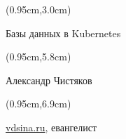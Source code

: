 \documentclass[xetex,18pt,aspectratio=43]{beamer}
\title[Базы данных в Kubernetes]{}
\author[Александр Чистяков, vdsina.ru]{}
\date{}
\newcommand\Bigfont{\fontsize{20}{20}\selectfont}
\newcommand\Authorfont{\fontsize{17}{17}\selectfont}
\newcommand\Orgfont{\fontsize{13}{13}\selectfont}
\begin{document}
{ %
    \begin{frame}[plain]
      \begin{textblock*}{\framewidth}(0.95cm,3.0cm) %
        \Bigfont
          \begin{center}
          Базы данных в Kubernetes
          \end{center}
      \end{textblock*}
      \begin{textblock*}{\framewidth}(0.95cm,5.8cm) %
        \Authorfont
          \begin{center}
          Александр Чистяков
          \end{center}
      \end{textblock*}
      \begin{textblock*}{\framewidth}(0.95cm,6.9cm) %
        \Orgfont
          \begin{center}
          \href{https://vdsina.ru}{\color{linkcolor}vdsina.ru}, евангелист
          \end{center}
      \end{textblock*}
     \end{frame}
}
\end{document}
